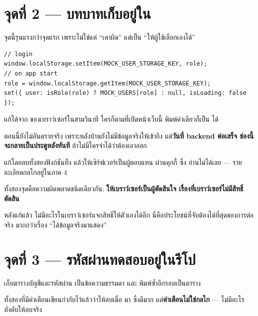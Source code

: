 \section{จุดที่ 2 --- บทบาทเก็บอยู่ใน }

จุดนี้รุนแรงกว่าจุดแรก เพราะไม่ใช่แค่ ``เดาผิด'' แต่เป็น ``ให้ผู้ใช้เลือกเองได้''

\begin{badbox}[title={\pzero\ ช่องโหว่ · \code{auth.store.ts:36, 46}}]
\begin{lstlisting}
// login
window.localStorage.setItem(MOCK_USER_STORAGE_KEY, role);
// on app start
role = window.localStorage.getItem(MOCK_USER_STORAGE_KEY);
set({ user: isRole(role) ? MOCK_USERS[role] : null, isLoading: false });
\end{lstlisting}
\vspace{-0.4em}
 แก้ได้จาก  ของเบราว์เซอร์ในสามวินาที
ใครก็ตามที่เปิดหน้าเว็บนี้ พิมพ์คำเดียวก็เป็น  ได้
\end{badbox}

ตอนนี้ยังไม่อันตรายจริง เพราะหลังบ้านยังไม่มีข้อมูลจริงให้เข้าถึง
แต่\textbf{วันที่ backend ต่อเสร็จ ช่องนี้จะกลายเป็นประตูหลังทันที}
ถ้าไม่มีใครจำได้ว่าต้องเอาออก

 แก้โดยลบทั้งสองฟังก์ชันทิ้ง แล้วให้เซิร์ฟเวอร์เป็นผู้ตอบแทน
ผ่านคุกกี้  ซึ่ง  อ่านไม่ได้เลย ---
รายละเอียดกลไกอยู่ในภาค 4

\begin{keybox}[title={ประโยคที่ร้อยจุดที่ 1 กับจุดที่ 2 เข้าด้วยกัน}]
ทั้งสองจุดคือความผิดพลาดชนิดเดียวกัน: \textbf{ให้เบราว์เซอร์เป็นผู้ตัดสินใจ
เรื่องที่เบราว์เซอร์ไม่มีสิทธิ์ตัดสิน}

หลังแก้แล้ว ไม่มีอะไรในเบราว์เซอร์แจกสิทธิ์ให้ตัวเองได้อีก
นี่คือประโยชน์ที่จับต้องได้ที่สุดของการต่อ  จริง
มากกว่าเรื่อง ``ได้ข้อมูลจริงมาแสดง''
\end{keybox}

\section{จุดที่ 3 --- รหัสผ่านทดสอบอยู่ในรีโป}

 เก็บตารางบัญชีและรหัสผ่าน
เป็นข้อความธรรมดา และ  พิมพ์ซ้ำอีกรอบเป็นตาราง

ทั้งสองที่มีคำเตือนเขียนกำกับไว้แล้วว่าให้ลบเมื่อ  มา
ซึ่งดีมาก แต่\textbf{คำเตือนไม่ใช่กลไก} --- ไม่มีอะไรบังคับให้ลบจริง


